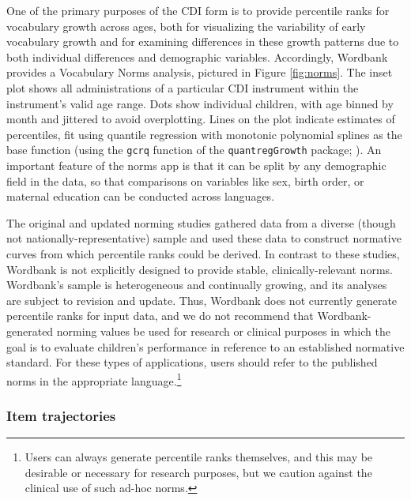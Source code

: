 \documentclass[man,noapacite]{apa}
\begin{document}
One of the primary purposes of the CDI form is to provide percentile ranks for vocabulary growth across ages, both for visualizing the variability of early vocabulary growth and for examining differences in these growth patterns due to both individual differences and demographic variables. Accordingly, Wordbank provides a Vocabulary Norms analysis, pictured in Figure \ref{fig:norms}. The inset plot shows all administrations of a particular CDI instrument within the instrument's valid age range. Dots show individual children, with age binned by month and jittered to avoid overplotting. Lines on the plot indicate estimates of percentiles, fit using quantile regression with monotonic polynomial splines as the base function (using the \texttt{gcrq} function of the \texttt{quantregGrowth} package; ). An important feature of the norms app is that it can be split by any demographic field in the data, so that comparisons on variables like sex, birth order, or maternal education can be conducted across languages. 

The original and updated norming studies \cite{fenson1994,fenson2007} gathered data from a diverse (though not nationally-representative) sample and used these data to construct normative curves from which percentile ranks could be derived. In contrast to these studies, Wordbank is not explicitly designed to provide stable, clinically-relevant norms. Wordbank's sample is heterogeneous and continually growing, and its analyses are subject to revision and update. Thus, Wordbank does not currently generate percentile ranks for input data, and we do not recommend that Wordbank-generated norming values be used for research or clinical purposes in which the goal is to evaluate children's performance in reference to an established normative standard. For these types of applications, users should refer to the published norms in the appropriate language.\footnote{Users can always generate percentile ranks themselves, and this may be desirable or necessary for research purposes, but we caution against the clinical use of such ad-hoc norms.}

\subsubsection{Item trajectories}
\end{document}
